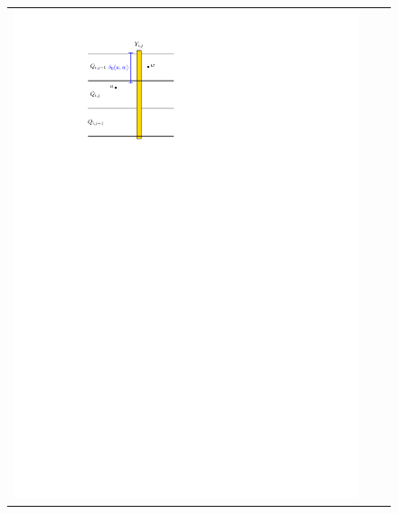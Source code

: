 \documentclass{patmorin}
\begin{document}
\begin{figure}
\begin{tabular}{ccc}
    \includegraphics[page=2,scale=0.9]{figs/new_metric} &

\end{tabular}
\end{figure}
\end{document}
